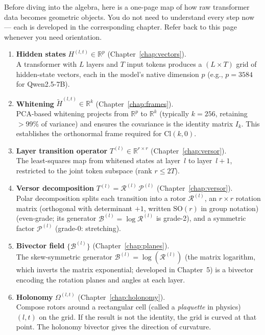 \documentclass[11pt, twoside, openright]{memoir}
\newcommand{\rotor}[1]{\mathcal{R}^{(#1)}}  %
\newcommand{\bivec}[1]{\mathcal{B}^{(#1)}}  %
\newcommand{\metric}[1]{\mathcal{P}^{(#1)}} %
\numberwithin{equation}{chapter}
\begin{document}
Before diving into the algebra, here is a one-page map of how raw
transformer data becomes geometric objects.  You do not need to
understand every step now --- each is developed in the corresponding
chapter.  Refer back to this page whenever you need orientation.

\begin{enumerate}
\item \textbf{Hidden states} $H^{(l,t)} \in \mathbb{R}^p$
  (Chapter~\ref{chap:vectors}).  \\
  A transformer with $L$ layers and $T$ input tokens produces a
  $(L \times T)$ grid of hidden-state vectors, each in the model's
  native dimension $p$ (e.g., $p = 3584$ for Qwen2.5-7B).

\item \textbf{Whitening} $\widetilde{H}^{(l,t)} \in \mathbb{R}^k$
  (Chapter~\ref{chap:frames}).  \\
  PCA-based whitening projects from $\mathbb{R}^p$ to $\mathbb{R}^k$
  (typically $k = 256$, retaining $>99\%$ of variance) and ensures
  the covariance is the identity matrix $I_k$.
  This establishes the orthonormal frame required for $\mathrm{Cl}(k, 0)$.

\item \textbf{Layer transition operator} $T^{(l)} \in \mathbb{R}^{r \times r}$
  (Chapter~\ref{chap:versor}).  \\
  The least-squares map from whitened states at layer~$l$ to layer~$l+1$,
  restricted to the joint token subspace (rank $r \le 2T$).

\item \textbf{Versor decomposition} $T^{(l)} = \rotor{l}\,\metric{l}$
  (Chapter~\ref{chap:versor}).  \\
  Polar decomposition splits each transition into a rotor
  $\rotor{l}$, an $r \times r$ rotation matrix (orthogonal with determinant $+1$, written $\mathrm{SO}(r)$ in group notation) (even-grade; its generator $\bivec{l} = \log \rotor{l}$ is grade-2), and a
  symmetric factor $\metric{l}$ (grade-0: stretching).

\item \textbf{Bivector field} $\{\bivec{l}\}$
  (Chapter~\ref{chap:planes}).  \\
  The skew-symmetric generator $\bivec{l} = \log(\rotor{l})$ (the matrix
  logarithm, which inverts the matrix exponential; developed in
  Chapter~5) is a bivector encoding the rotation planes and angles at
  each layer.

\item \textbf{Holonomy} $\Omega^{(l,t)}$
  (Chapter~\ref{chap:holonomy}).  \\
  Compose rotors around a rectangular cell (called a \emph{plaquette} in physics) $(l, t)$ on the grid.  If the
  result is not the identity, the grid is curved at that point.
  The holonomy bivector gives the direction of curvature.


\end{enumerate}
\end{document}
